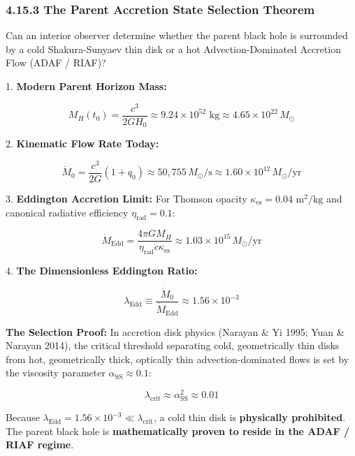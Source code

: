 \documentclass[11pt,a4paper]{article}
\theoremstyle{definition}\newtheorem{definition}{Definition}
\theoremstyle{remark}\newtheorem{remark}{Remark}
\begin{document}
\subsubsection{4.15.3 The Parent Accretion State Selection Theorem}

Can an interior observer determine whether the parent black hole is surrounded by a cold Shakura-Sunyaev thin disk or a hot Advection-Dominated Accretion Flow (ADAF / RIAF)?

1. \textbf{Modern Parent Horizon Mass:}


\begin{equation}
M_H(t_0) = \frac{c^3}{2GH_0} \approx 9.24 \times 10^{52} \text{ kg} \approx 4.65 \times 10^{22} \, M_\odot
\end{equation}


2. \textbf{Kinematic Flow Rate Today:}


\begin{equation}
\dot{M}_0 = \frac{c^3}{2G}(1 + q_0) \approx 50{,}755 \, M_\odot/\text{s} \approx 1.60 \times 10^{12} \, M_\odot/\text{yr}
\end{equation}


3. \textbf{Eddington Accretion Limit:}
For Thomson opacity $\kappa_{\text{es}} = 0.04 \text{ m}^2/\text{kg}$ and canonical radiative efficiency $\eta_{\text{rad}} = 0.1$:


\begin{equation}
\dot{M}_{\text{Edd}} = \frac{4\pi G M_H}{\eta_{\text{rad}} c \kappa_{\text{es}}} \approx 1.03 \times 10^{15} \, M_\odot/\text{yr}
\end{equation}


4. \textbf{The Dimensionless Eddington Ratio:}


\begin{equation}
\boxed{\lambda_{\text{Edd}} \equiv \frac{\dot{M}_0}{\dot{M}_{\text{Edd}}} \approx 1.56 \times 10^{-3}}
\end{equation}


\textbf{The Selection Proof:} In accretion disk physics (Narayan \& Yi 1995; Yuan \& Narayan 2014), the critical threshold separating cold, geometrically thin disks from hot, geometrically thick, optically thin advection-dominated flows is set by the viscosity parameter $\alpha_{\text{SS}} \approx 0.1$:


\begin{equation}
\lambda_{\text{crit}} \approx \alpha_{\text{SS}}^2 \approx 0.01
\end{equation}


Because $\lambda_{\text{Edd}} = 1.56 \times 10^{-3} \ll \lambda_{\text{crit}}$, a cold thin disk is \textbf{physically prohibited}. The parent black hole is \textbf{mathematically proven to reside in the ADAF / RIAF regime}.
\end{document}
